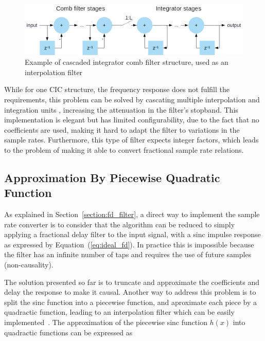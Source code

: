 \begin{figure}[!htb]
  \centering
  \includegraphics[width=\textwidth]{Figures/cic_filter.png}
  \caption{Example of cascaded integrator comb filter structure, used as an interpolation filter}
  \label{fig:cic_basic}
\end{figure}

While for one CIC structure, the frequency response does not fulfill the
requirements, this problem can be solved by cascating multiple interpolation and
integration units \cite{charanjit:impl}, increasing the attenuation in the
filter's stopband. This implementation is elegant but has limited
configurability, due to the fact that no coefficients are used, making it hard
to adapt the filter to variations in the sample rates. Furthermore, this type of
filter expects integer factors, which leads to the problem of making it able to
convert fractional sample rate relations.

\subsection{Approximation By Piecewise Quadratic Function}
\label{subsection:piecewise}

As explained in Section~\ref{section:fd_filter}, a direct way to implement the
sample rate converter is to consider that the algorithm can be reduced to simply
applying a fractional delay filter to the input signal, with a sinc impulse
response as expressed by Equation~(\ref{eq:ideal_fd}). In practice this is
impossible because the filter has an infinite number of taps and requires the
use of future samples (non-causality).

The solution presented so far is to truncate and approximate the coefficients
and delay the response to make it causal. Another way to address this problem is
to split the sinc function into a piecewise function, and aproximate each piece
by a quadractic function, leading to an interpolation filter which can be easily
implemented~\cite{aikawa:kernel,aikawa:kernel_hw}. The approximation of the
piecewise sinc function $h(x)$ into quadractic functions can be expressed as

